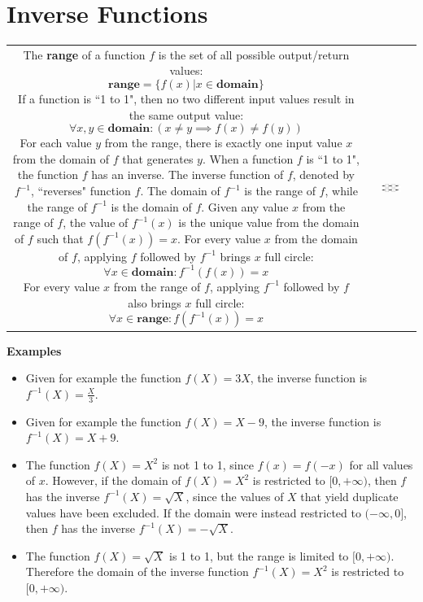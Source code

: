 \documentclass{article}
\begin{document}
\section{Inverse Functions}

\begin{tabular}{cc}
\parbox{0.5\textwidth}{
The {\bf range} of a function \(f\) is the set of all possible output/return values:
\[\textbf{range} = \{f(x) | x \in \textbf{domain}\}\]
If a function is ``1 to 1", then no two different input values result in the same output value: 
\[\forall x,y \in \textbf{domain} : (x \neq y \implies f(x) \neq f(y))\]
For each value \(y\) from the range, there is exactly one input value \(x\) from the domain of \(f\) that generates \(y\). When a function \(f\) is ``1 to 1", the function \(f\) has an inverse. The inverse function of \(f\), denoted by \(f^{-1}\), ``reverses" function \(f\). The domain of \(f^{-1}\) is the range of \(f\), while the range of \(f^{-1}\) is the domain of \(f\). Given any value \(x\) from the range of \(f\), the value of \(f^{-1}(x)\) is the unique value from the domain of \(f\) such that \(f(f^{-1}(x)) = x\). For every value \(x\) from the domain of \(f\), applying \(f\) followed by \(f^{-1}\) brings \(x\) full circle: 
\[\forall x \in \textbf{domain} : f^{-1}(f(x)) = x\]
For every value \(x\) from the range of \(f\), applying \(f^{-1}\) followed by \(f\) also brings \(x\) full circle:
\[\forall x \in \textbf{range} : f(f^{-1}(x)) = x\] 
} & \parbox{0.5\textwidth}{
\includegraphics[width = 0.5\textwidth]{function_box_inverse} 
}
\end{tabular}

\textbf{Examples}
\begin{itemize}
\item Given for example the function \(f(X) = 3X\), the inverse function is \(f^{-1}(X) = \frac{X}{3}\). 
\item Given for example the function \(f(X) = X - 9\), the inverse function is \(f^{-1}(X) = X + 9\). 
\item The function \(f(X) = X^2\) is not 1 to 1, since \(f(x) = f(-x)\) for all values of \(x\). However, if the domain of \(f(X) = X^2\) is restricted to \([0, +\infty)\), then \(f\) has the inverse \(f^{-1}(X) = \sqrt{X}\), since the values of \(X\) that yield duplicate values have been excluded. If the domain were instead restricted to \((-\infty, 0]\), then \(f\) has the inverse \(f^{-1}(X) = -\sqrt{X}\).
\item The function \(f(X) = \sqrt{X}\) is 1 to 1, but the range is limited to \([0, +\infty)\). Therefore the domain of the inverse function \(f^{-1}(X) = X^2\) is restricted to \([0, +\infty)\).
\end{itemize}
\end{document}
